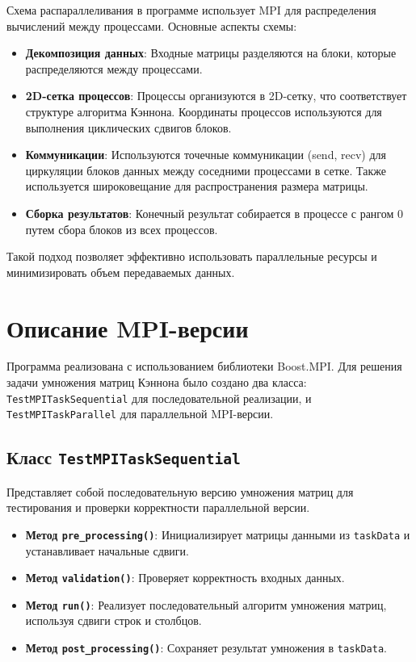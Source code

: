\documentclass[12pt]{article}
\begin{document}
Схема распараллеливания в программе использует MPI для распределения вычислений между процессами. Основные аспекты схемы:
\begin{itemize}
    \item \textbf{Декомпозиция данных}: Входные матрицы разделяются на блоки, которые распределяются между процессами.
    \item \textbf{2D-сетка процессов}: Процессы организуются в 2D-сетку, что соответствует структуре алгоритма Кэннона. Координаты процессов используются для выполнения циклических сдвигов блоков.
    \item \textbf{Коммуникации}: Используются точечные коммуникации (send, recv) для циркуляции блоков данных между соседними процессами в сетке. Также используется широковещание для распространения размера матрицы.
    \item \textbf{Сборка результатов}: Конечный результат собирается в процессе с рангом 0 путем сбора блоков из всех процессов.
\end{itemize}
Такой подход позволяет эффективно использовать параллельные ресурсы и минимизировать объем передаваемых данных.

\section{Описание MPI-версии}

Программа реализована с использованием библиотеки Boost.MPI. Для решения задачи умножения матриц Кэннона было создано два класса: \texttt{TestMPITaskSequential} для последовательной реализации, и \texttt{TestMPITaskParallel} для параллельной MPI-версии. 

\subsection{Класс \texttt{TestMPITaskSequential}}
Представляет собой последовательную версию умножения матриц для тестирования и проверки корректности параллельной версии.
\begin{itemize}
    \item \textbf{Метод \texttt{pre\_processing()}}: Инициализирует матрицы данными из \texttt{taskData} и устанавливает начальные сдвиги.
    \item \textbf{Метод \texttt{validation()}}: Проверяет корректность входных данных.
    \item \textbf{Метод \texttt{run()}}: Реализует последовательный алгоритм умножения матриц, используя сдвиги строк и столбцов.
    \item \textbf{Метод \texttt{post\_processing()}}: Сохраняет результат умножения в \texttt{taskData}.
\end{itemize}
\end{document}
